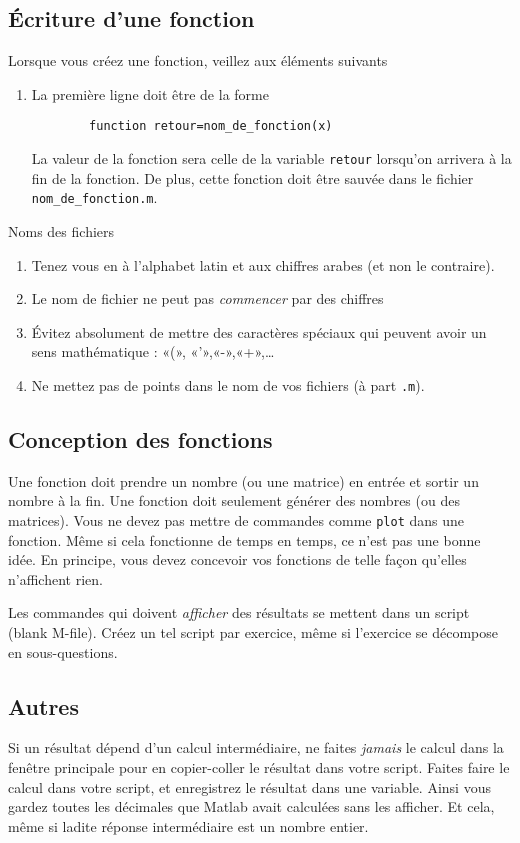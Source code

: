 \subsection{Écriture d'une fonction}

Lorsque vous créez une fonction, veillez aux éléments suivants
\begin{enumerate}

	\item
	      La première ligne doit être de la forme
	      \begin{verbatim}
		function retour=nom_de_fonction(x)
		\end{verbatim}
	      La valeur de la fonction sera celle de la variable \verb+retour+ lorsqu'on arrivera à la fin de la fonction. De plus, cette fonction doit être sauvée dans le fichier \verb+nom_de_fonction.m+.

\end{enumerate}

Noms des fichiers
\begin{enumerate}
	\item
	      Tenez vous en à l'alphabet latin et aux chiffres arabes (et non le contraire).
	\item
	      Le nom de fichier ne peut pas \emph{commencer} par des chiffres
	\item
	      Évitez absolument de mettre des caractères spéciaux qui peuvent avoir un sens mathématique : «(», «'»,«-»,«+»,\ldots
	\item
	      Ne mettez pas de points dans le nom de vos fichiers (à part \verb+.m+).
\end{enumerate}

\subsection{Conception des fonctions}

Une fonction doit prendre un nombre (ou une matrice) en entrée et sortir un nombre à la fin. Une fonction doit seulement générer des nombres (ou des matrices). Vous ne devez pas mettre de commandes comme \verb+plot+ dans une fonction. Même si cela fonctionne de temps en temps, ce n'est pas une bonne idée. En principe, vous devez concevoir vos fonctions de telle façon qu'elles n'affichent rien.

Les commandes qui doivent \emph{afficher} des résultats se mettent dans un script (blank M-file). Créez un tel script par exercice, même si l'exercice se décompose en sous-questions.

\subsection{Autres}

Si un résultat dépend d'un calcul intermédiaire, ne faites \emph{jamais} le calcul dans la fenêtre principale pour en copier-coller le résultat dans votre script. Faites faire le calcul dans votre script, et enregistrez le résultat dans une variable. Ainsi vous gardez toutes les décimales que Matlab avait calculées sans les afficher. Et cela, même si ladite réponse intermédiaire est un nombre entier.
